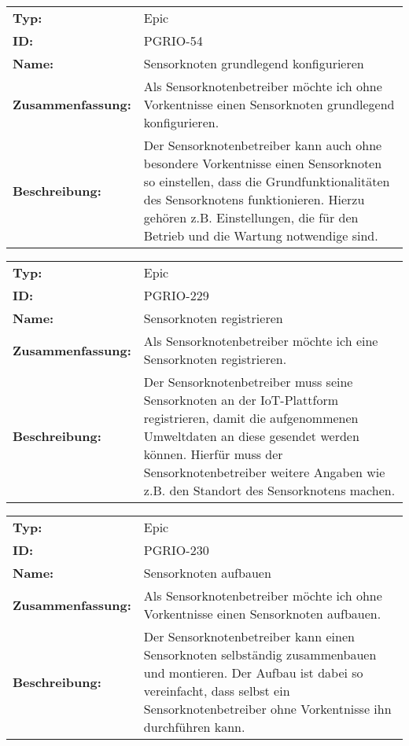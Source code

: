 		\begin{flushleft} 
\begin{tabular}{@{}lp{100mm}} 
\textbf{Typ:} & Epic \\ 
\textbf{ID:} & PGRIO-54 \\ 
\textbf{Name:} & Sensorknoten grundlegend konfigurieren \\ 
\textbf{Zusammenfassung:} & Als Sensorknotenbetreiber möchte ich ohne Vorkentnisse einen Sensorknoten grundlegend konfigurieren. \\ 
\textbf{Beschreibung:} & Der Sensorknotenbetreiber kann auch ohne besondere Vorkentnisse einen Sensorknoten so einstellen, dass die Grundfunktionalitäten des Sensorknotens funktionieren. Hierzu gehören z.B. Einstellungen, die für den Betrieb und die Wartung notwendige sind. \\ 
\end{tabular} 
\end{flushleft} 

		\begin{flushleft} 
\begin{tabular}{@{}lp{100mm}} 
\textbf{Typ:} & Epic \\ 
\textbf{ID:} & PGRIO-229 \\ 
\textbf{Name:} & Sensorknoten registrieren \\ 
\textbf{Zusammenfassung:} & Als Sensorknotenbetreiber möchte ich eine Sensorknoten registrieren. \\ 
\textbf{Beschreibung:} & Der Sensorknotenbetreiber muss seine Sensorknoten an der IoT-Plattform registrieren, damit die aufgenommenen Umweltdaten an diese gesendet werden können. Hierfür muss der Sensorknotenbetreiber weitere Angaben wie z.B. den Standort des Sensorknotens machen. \\ 
\end{tabular} 
\end{flushleft} 

		\begin{flushleft} 
\begin{tabular}{@{}lp{100mm}} 
\textbf{Typ:} & Epic \\ 
\textbf{ID:} & PGRIO-230 \\ 
\textbf{Name:} & Sensorknoten aufbauen \\ 
\textbf{Zusammenfassung:} & Als Sensorknotenbetreiber möchte ich ohne Vorkentnisse einen Sensorknoten aufbauen. \\ 
\textbf{Beschreibung:} & Der Sensorknotenbetreiber kann einen Sensorknoten selbständig zusammenbauen und montieren. Der Aufbau ist dabei so vereinfacht, dass selbst ein Sensorknotenbetreiber ohne Vorkentnisse ihn durchführen kann. \\ 
\end{tabular} 
\end{flushleft} 

